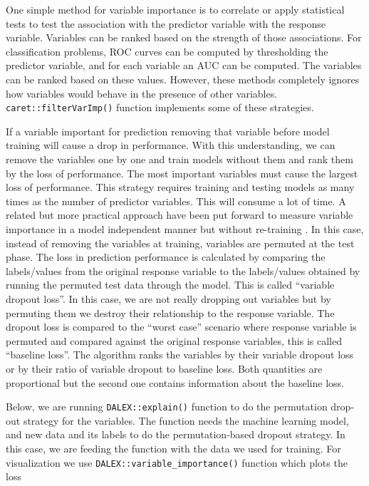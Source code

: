 \documentclass[12pt,]{krantz}
\begin{document}
One simple method for variable importance is to correlate or apply statistical tests to test the association with the predictor variable with the response variable. Variables can be ranked based on the strength of those associations. For classification problems, ROC curves can be computed by thresholding the predictor variable, and for each variable an AUC can be computed. The variables can be ranked based on these values. However, these methods completely ignores how variables would behave in the presence of other variables. \texttt{caret::filterVarImp()} function implements some of these strategies.

If a variable important for prediction removing that variable before model training will cause a drop in performance. With this understanding, we can remove the variables one by one and train models without them and rank them by the loss of performance. The most important variables must cause the largest loss of performance. This strategy requires training and testing models as many times as the number of predictor variables. This will consume a lot of time. A related but more practical approach have been put forward to measure variable importance in a model independent manner but without re-training \citep{dalex, mcr}. In this case, instead of removing the variables at training, variables are permuted at the test phase. The loss in prediction performance is calculated by comparing the labels/values from the original response variable to the labels/values obtained by running the permuted test data through the model. This is called ``variable dropout loss''. In this case, we are not really dropping out variables but by permuting them we destroy their relationship to the response variable. The dropout loss is compared to the ``worst case'' scenario where response variable is permuted and compared against the original response variables, this is called ``baseline loss''. The algorithm ranks the variables by their variable dropout loss or by their ratio of variable dropout to baseline loss. Both quantities are proportional but the second one contains information about the baseline loss.

Below, we are running \texttt{DALEX::explain()} function to do the permutation drop-out strategy for the variables. The function needs the machine learning model, and new data and its labels to do the permutation-based dropout strategy. In this case, we are feeding the function with the data we used for training. For visualization we use \texttt{DALEX::variable\_importance()} function which plots the loss
\end{document}
